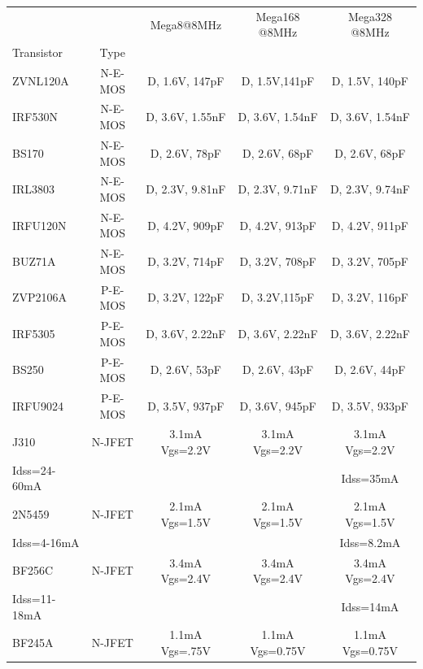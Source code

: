\begin{table}[H]
  \begin{center}
    \begin{tabular}{| l | c | c | c | c |}
    \hline
             &         & Mega8@8MHz       & Mega168 @8MHz    & Mega328 @8MHz \\
 Transistor  & Type    &                  &                  &               \\
    \hline
    \hline
ZVNL120A     & N-E-MOS & D, 1.6V, 147pF   & D, 1.5V,141pF    & D, 1.5V, 140pF \\
    \hline
IRF530N      & N-E-MOS & D, 3.6V, 1.55nF  & D, 3.6V, 1.54nF  & D, 3.6V, 1.54nF \\
    \hline
BS170        & N-E-MOS & D, 2.6V, 78pF    & D, 2.6V, 68pF    & D, 2.6V, 68pF \\
    \hline
IRL3803      & N-E-MOS & D, 2.3V, 9.81nF  & D, 2.3V, 9.71nF  & D, 2.3V, 9.74nF \\
    \hline
IRFU120N     & N-E-MOS & D, 4.2V, 909pF   & D, 4.2V, 913pF   & D, 4.2V, 911pF \\
    \hline
BUZ71A       & N-E-MOS & D, 3.2V, 714pF   & D, 3.2V, 708pF   & D, 3.2V, 705pF \\
    \hline
ZVP2106A     & P-E-MOS & D, 3.2V, 122pF   & D, 3.2V,115pF    & D, 3.2V, 116pF \\
    \hline
IRF5305      & P-E-MOS & D, 3.6V, 2.22nF  & D, 3.6V, 2.22nF  & D, 3.6V, 2.22nF \\
    \hline
BS250        & P-E-MOS & D, 2.6V, 53pF    & D, 2.6V, 43pF    & D, 2.6V, 44pF \\
    \hline
IRFU9024     & P-E-MOS & D, 3.5V, 937pF   & D, 3.6V, 945pF   & D, 3.5V, 933pF \\
    \hline
J310         & N-JFET  & 3.1mA Vgs=2.2V   & 3.1mA Vgs=2.2V   & 3.1mA Vgs=2.2V \\
Idss=24-60mA &         &                  &                  & Idss=35mA      \\
    \hline
2N5459       & N-JFET  & 2.1mA Vgs=1.5V   & 2.1mA Vgs=1.5V   & 2.1mA Vgs=1.5V \\
Idss=4-16mA &          &                  &                  & Idss=8.2mA     \\
    \hline
BF256C       & N-JFET  & 3.4mA Vgs=2.4V   & 3.4mA Vgs=2.4V   & 3.4mA Vgs=2.4V \\
Idss=11-18mA &         &                  &                  & Idss=14mA      \\
    \hline
BF245A       & N-JFET  & 1.1mA Vgs=.75V   & 1.1mA Vgs=0.75V  & 1.1mA Vgs=0.75V \\

\end{tabular}
\end{center}
\end{table}
